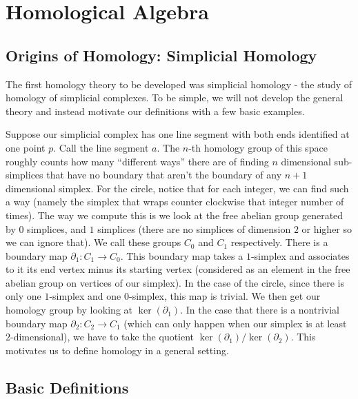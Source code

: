 \chapter{Homological Algebra}
\section{Origins of Homology: Simplicial Homology}

The first homology theory
to be developed was simplicial homology - the study of homology
of simplicial
complexes. To be simple, we will not develop the general theory
and instead
motivate our definitions with a few basic examples.  

\begin{example} Suppose
our simplicial complex has one line segment with both ends
identified at
one point $p$. Call the line segment $a$. The $n$-th homology
group of this
space roughly counts how many ``different ways'' there are of
finding $n$
dimensional sub-simplices that have no boundary that aren't the
boundary of
any $n+1$ dimensional simplex. For the circle, notice that for
each integer,
we can find such a way (namely the simplex that wraps counter
clockwise that
integer number of times). The way we compute this is we look at
the free abelian group generated by $0$ simplices, and $1$
simplices (there are no simplices of
dimension $2$ or higher so we can ignore that). We call these
groups $C_0$ and
$C_1$ respectively. There is a boundary map $\partial_1:
C_1\rightarrow C_0$.
This boundary map takes a $1$-simplex and associates to it its
end vertex minus
its starting vertex (considered as an element in the free
abelian group on
vertices of our simplex). In the case of the circle, since there
is only one
$1$-simplex and one $0$-simplex, this map is trivial. We then
get our homology
group by looking at $\ker(\partial_1)$. In the case that there
is a nontrivial
boundary map $\partial_2: C_2\rightarrow C_1$ (which can only
happen when our
simplex is at least $2$-dimensional), we have to take the
quotient
$\ker(\partial_1)/\ker(\partial_2)$. This motivates us to define
homology in a
general setting.
\end{example}

\section{Basic Definitions}

